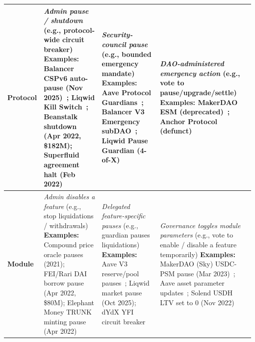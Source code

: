 \documentclass[12pt]{article}
\begin{document}
\begin{table}[!htbp]
\begin{tabularx}{\linewidth}{
  >{\raggedright\arraybackslash}p{2.0cm}
  >{\raggedright\arraybackslash}X
  >{\raggedright\arraybackslash}X
  >{\raggedright\arraybackslash}X
}
\textbf{Protocol}
&
\emph{Admin pause / shutdown} \newline
(e.g., protocol-wide circuit breaker) \newline
\textbf{Examples:} Balancer CSPv6 auto-pause (Nov 2025)~\cite{BalancerPostMortem2025}; Liqwid Kill Switch~\cite{Liqwid2024Governance}; Beanstalk shutdown (Apr 2022, \$182M); Superfluid agreement halt (Feb 2022)
&
\emph{Security-council pause} \newline
(e.g., bounded emergency mandate) \newline
\textbf{Examples:} Aave Protocol Guardians~\cite{AaveGuardians}; Balancer V3 Emergency subDAO~\cite{BalancerV3EmergencySubDAO}; Liqwid Pause Guardian (4-of-X)
&
\emph{DAO-administered emergency action} \newline
(e.g., vote to pause/upgrade/settle) \newline
\textbf{Examples:} MakerDAO ESM (deprecated)~\cite{MakerDAOEmergencyShutdown}; Anchor Protocol (defunct)~\cite{Anchor2022} \\
\midrule

\textbf{Module}
&
\emph{Admin disables a feature} \newline
(e.g., stop liquidations / withdrawals) \newline
\textbf{Examples:} Compound price oracle pauses (2021); FEI/Rari DAI borrow pause (Apr 2022, \$80M); Elephant Money TRUNK minting pause (Apr 2022)
&
\emph{Delegated feature-specific pauses} \newline
(e.g., guardian pauses liquidations) \newline
\textbf{Examples:} Aave V3 reserve/pool pauses~\cite{AaveACLManager}; Liqwid market pause (Oct 2025); dYdX YFI circuit breaker~\cite{dYdXSushiYFI}
&
\emph{Governance toggles module parameters} \newline
(e.g., vote to enable / disable a feature temporarily) \newline
\textbf{Examples:} MakerDAO (Sky) USDC-PSM pause (Mar 2023)~\cite{MakerDAOEmergency2023}; Aave asset parameter updates~\cite{AaveDPIFreezeProposal}; Solend USDH LTV set to 0 (Nov 2022) \\
\midrule


\end{tabularx}
\end{table}
\end{document}
